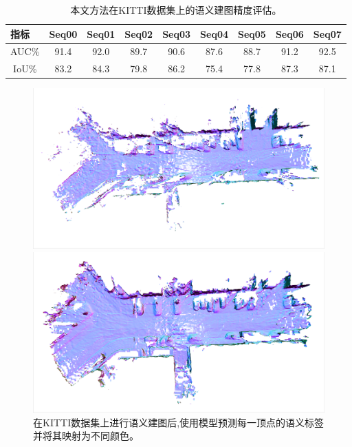 \begin{table}[htbp]
    \centering
    \caption{本文方法在KITTI数据集上的语义建图精度评估。}\label{kittimetrics}
    \begin{tabular}[htbp]{cccccccccc}
        \toprule
        \multicolumn{2}{l}{指标} & Seq00 & Seq01 & Seq02 &Seq03&Seq04&Seq05&Seq06&Seq07 \\
        \midrule
        \multicolumn{2}{l}{AUC\%} & 91.4 & 92.0 & 89.7 & 90.6 &87.6&88.7&91.2&92.5\\
        \multicolumn{2}{c}{IoU\%} & 83.2& 84.3&79.8&86.2&75.4&77.8&87.3&87.1 \\
        \bottomrule
    \end{tabular}
\end{table}
\begin{figure}[htbp]
	\centering
	\begin{minipage}{0.5\linewidth}
		\centering
		\includegraphics[width=1\linewidth]{figures/50w.png}
	\end{minipage}\hfill
	\begin{minipage}{0.5\linewidth}
		\centering
		\includegraphics[width=1\linewidth]{figures/50o.png}
	\end{minipage}
    \caption{在KITTI数据集上进行语义建图后,使用模型预测每一顶点的语义标签并将其映射为不同颜色。}\label{semresult}
\end{figure}

